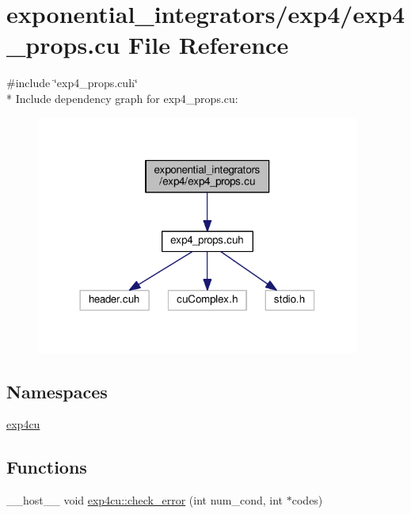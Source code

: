 \hypertarget{exp4__props_8cu}{}\section{exponential\+\_\+integrators/exp4/exp4\+\_\+props.cu File Reference}
\label{exp4__props_8cu}
{\ttfamily \#include \char`\"{}exp4\+\_\+props.\+cuh\char`\"{}}\\*
Include dependency graph for exp4\+\_\+props.\+cu\+:\nopagebreak
\begin{figure}[H]
\begin{center}
\leavevmode
\includegraphics[width=302pt]{exp4__props_8cu__incl}
\end{center}
\end{figure}
\subsection*{Namespaces}
\begin{DoxyCompactItemize}
\item 
 \hyperlink{namespaceexp4cu}{exp4cu}
\end{DoxyCompactItemize}
\subsection*{Functions}
\begin{DoxyCompactItemize}
\item 
\+\_\+\+\_\+host\+\_\+\+\_\+ void \hyperlink{namespaceexp4cu_a2d5234f5e9971aec336ac64ce719f1f4}{exp4cu\+::check\+\_\+error} (int num\+\_\+cond, int $\ast$codes)
\end{DoxyCompactItemize}
